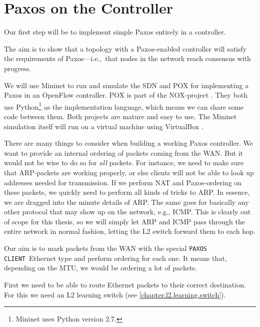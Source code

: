 \section{Paxos on the Controller}

Our first step will be to implement simple Paxos \cite{Lam01} entirely in a
controller.

The aim is to show that a topology with a Paxos-enabled controller will
satisfy the requirements of Paxos---i.e.,~that nodes in the network reach
consensus with progress.

We will use Mininet \cite{Lantz:2010:NLR:1868447.1868466} to
run and simulate the \ac{SDN} and POX \cite{POX.1} for
implementing a Paxos in an OpenFlow controller.  POX is part of the
NOX-project \cite{Gude:2008:NTO:1384609.1384625}.  They both use
Python\footnote{Mininet uses Python version 2.7.}
\cite{vanRossum:2009:PRM:1610526} as the implementation language, which
means we can share some code between them.  Both projects are mature and
easy to use.  The Mininet simulation itself will run on a virtual machine
using VirtualBox \cite{Watson:2008:VBB:1344209.1344210}.

There are many things to consider when building a working Paxos controller.
We want to provide an internal ordering of packets coming from the \ac{WAN}.
But it would not be wise to do so for \textit{all} packets. For instance, we
need to make sure that \ac{ARP}-packets are working properly, or else
clients will not be able to look up addresses needed for transmission.
If we perform \ac{NAT} and Paxos-ordering on these packets, we quickly need
to perform all kinds of tricks to \acs{ARP}.  In essence, we are dragged
into the minute details of \acs{ARP}.  The same goes for basically any other
protocol that may show up on the network, e.g., \ac{ICMP}.
%
This is clearly out of scope for this
thesis, so we will simply let \acs{ARP} and \acs{ICMP} pass through the
entire network in normal fashion, letting the \acs{L2} switch forward them
to each hop.

Our aim is to mark packets from the \ac{WAN} with the special
\texttt{PAXOS CLIENT} Ethernet type and perform ordering for each one.
It means that, depending on the \ac{MTU}, we would be ordering a lot of
packets.

First we need to be able to route Ethernet packets to their correct
destination. For this we need an \ac{L2} learning switch (see
    \vref{chapter:l2.learning.switch}).

